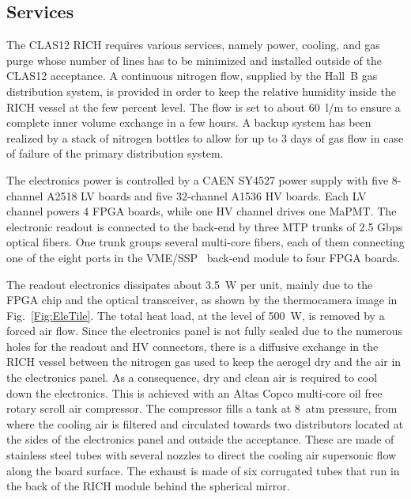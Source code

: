 \documentclass[5p,times,twocolumn]{elsarticle}
\begin{document}
\subsection{Services}

The CLAS12 RICH requires various services, namely power, cooling, and gas purge whose number of lines has to be
minimized and installed outside of the CLAS12 acceptance. A continuous nitrogen flow, supplied by the Hall~B gas
distribution system, is provided in order to keep the relative humidity inside the RICH vessel at the few percent
level. The flow is set to about 60~l/m to ensure a complete inner volume exchange in a few hours. 
A backup system has been realized by a stack of nitrogen bottles to allow for up to 3 days of gas flow in case of
failure of the primary distribution system.

The electronics power is controlled by a CAEN SY4527 power supply with five 8-channel A2518 LV boards and five
32-channel A1536 HV boards. Each LV channel powers 4 FPGA boards, while one HV channel drives one MaPMT. The
electronic readout is connected to the back-end by three MTP trunks of 2.5 Gbps optical fibers. One trunk groups
several multi-core fibers, each of them connecting one of the eight ports in the VME/SSP~\cite{daq-nim} back-end
module to four FPGA boards.

The readout electronics dissipates about 3.5~W per unit, mainly due to the FPGA chip and the optical transceiver, as
shown by the thermocamera image in Fig.~\ref{Fig:EleTile}. The total heat load, at the level of 500~W, is removed by
a forced air flow. Since the electronics panel is not fully sealed due to the numerous holes for the readout and HV
connectors, there is a diffusive exchange in the RICH vessel between the nitrogen gas used to keep the aerogel dry
and the air in the electronics panel. As a consequence, dry and clean air is required to cool down the electronics. This
is achieved with an Altas Copco multi-core oil free rotary scroll air compressor. The compressor fills a tank at 8~atm
pressure, from where the cooling air is filtered and circulated towards two distributors located at the sides of the
electronics panel and outside the acceptance. These are made of stainless steel tubes with several nozzles to direct
the cooling air supersonic flow along the board surface. The exhaust is made of six corrugated tubes that run in the
back of the RICH module behind the spherical mirror.
\end{document}

